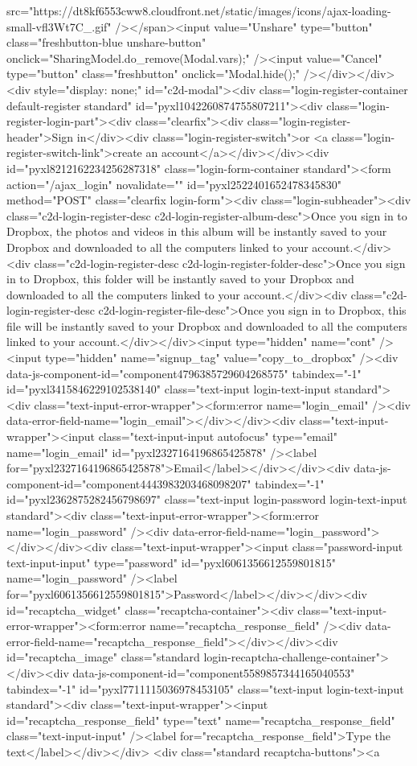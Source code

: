 {src="https://dt8kf6553cww8.cloudfront.net/static/images/icons/ajax-loading-small-vfl3Wt7C_.gif" /></span><input value="Unshare" type="button" class="freshbutton-blue unshare-button" onclick="SharingModel.do_remove(Modal.vars);" /><input value="Cancel" type="button" class="freshbutton" onclick="Modal.hide();" /></div></div><div style="display: none;" id="c2d-modal"><div class="login-register-container default-register standard" id="pyxl1042260874755807211"><div class="login-register-login-part"><div class="clearfix"><div class="login-register-header">Sign in</div><div class="login-register-switch">or <a class="login-register-switch-link">create an account</a></div></div><div id="pyxl8212162234256287318" class="login-form-container  standard"><form action="/ajax_login" novalidate="" id="pyxl2522401652478345830" method="POST" class="clearfix login-form"><div class="login-subheader"><div class="c2d-login-register-desc c2d-login-register-album-desc">Once you sign in to Dropbox, the photos and videos in this album will be instantly saved to your Dropbox and downloaded to all the computers linked to your account.</div><div class="c2d-login-register-desc c2d-login-register-folder-desc">Once you sign in to Dropbox, this folder will be instantly saved to your Dropbox and downloaded to all the computers linked to your account.</div><div class="c2d-login-register-desc c2d-login-register-file-desc">Once you sign in to Dropbox, this file will be instantly saved to your Dropbox and downloaded to all the computers linked to your account.</div></div><input type="hidden" name="cont" /><input type="hidden" name="signup_tag" value="copy_to_dropbox" /><div data-js-component-id="component4796385729604268575" tabindex="-1" id="pyxl3415846229102538140" class="text-input login-text-input standard"><div class="text-input-error-wrapper"><form:error name="login_email" /><div data-error-field-name="login_email"></div></div><div class="text-input-wrapper"><input class="text-input-input autofocus" type="email" name="login_email" id="pyxl2327164196865425878" /><label for="pyxl2327164196865425878">Email</label></div></div><div data-js-component-id="component4443983203468098207" tabindex="-1" id="pyxl2362875282456798697" class="text-input login-password login-text-input standard"><div class="text-input-error-wrapper"><form:error name="login_password" /><div data-error-field-name="login_password"></div></div><div class="text-input-wrapper"><input class="password-input text-input-input" type="password" id="pyxl6061356612559801815" name="login_password" /><label for="pyxl6061356612559801815">Password</label></div></div><div id="recaptcha_widget" class="recaptcha-container"><div class="text-input-error-wrapper"><form:error name="recaptcha_response_field" /><div data-error-field-name="recaptcha_response_field"></div></div><div id="recaptcha_image" class="standard login-recaptcha-challenge-container"></div><div data-js-component-id="component5589857344165040553" tabindex="-1" id="pyxl7711115036978453105" class="text-input login-text-input standard"><div class="text-input-wrapper"><input id="recaptcha_response_field" type="text" name="recaptcha_response_field" class="text-input-input" /><label for="recaptcha_response_field">Type the text</label></div></div> <div class="standard recaptcha-buttons"><a }
